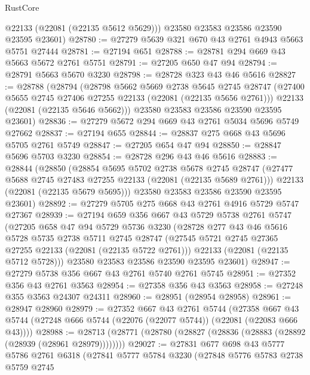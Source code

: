 \begin{lexlean}{RustCore}
\begin{coremodule}
        @22133
        (@22081 (@22135 @5612 @5629)))
      @23580
      @23583
      @23586
      @23590
      @23595
      @23601)
@28780 := @27279 @5639 @321 @670 @43 @2761 @4943 @5663 @5751 @27444
@28781 := @27194 @651
@28788 := @28781 @294 @669 @43 @5663 @5672 @2761 @5751
@28791 := @27205 @650 @47 @94
@28794 := @28791 @5663 @5670 @3230
@28798 := @28728 @323 @43 @46 @5616
@28827 := @28788
    (@28794
      (@28798
        @5662
        @5669
        @2738
        @5645
        @2745
        @28747
        (@27400 @5655 @2745 @27406 @27255 @22133 (@22081 (@22135 @5656 @2761)))
        @22133
        (@22081 (@22135 @5646 @5662)))
      @23580
      @23583
      @23586
      @23590
      @23595
      @23601)
@28836 := @27279 @5672 @294 @669 @43 @2761 @5034 @5696 @5749 @27662
@28837 := @27194 @655
@28844 := @28837 @275 @668 @43 @5696 @5705 @2761 @5749
@28847 := @27205 @654 @47 @94
@28850 := @28847 @5696 @5703 @3230
@28854 := @28728 @296 @43 @46 @5616
@28883 := @28844
    (@28850
      (@28854
        @5695
        @5702
        @2738
        @5678
        @2745
        @28747
        (@27477 @5688 @2745 @27483 @27255 @22133 (@22081 (@22135 @5689 @2761)))
        @22133
        (@22081 (@22135 @5679 @5695)))
      @23580
      @23583
      @23586
      @23590
      @23595
      @23601)
@28892 := @27279 @5705 @275 @668 @43 @2761 @4916 @5729 @5747 @27367
@28939 := @27194
    @659
    @356
    @667
    @43
    @5729
    @5738
    @2761
    @5747
    (@27205
      @658
      @47
      @94
      @5729
      @5736
      @3230
      (@28728
        @277
        @43
        @46
        @5616
        @5728
        @5735
        @2738
        @5711
        @2745
        @28747
        (@27545 @5721 @2745 @27365 @27255 @22133 (@22081 (@22135 @5722 @2761)))
        @22133
        (@22081 (@22135 @5712 @5728)))
      @23580
      @23583
      @23586
      @23590
      @23595
      @23601)
@28947 := @27279 @5738 @356 @667 @43 @2761 @5740 @2761 @5745
@28951 := @27352 @356 @43 @2761 @3563
@28954 := @27358 @356 @43 @3563
@28958 := @27248 @355 @3563 @24307 @24311
@28960 := @28951 (@28954 @28958)
@28961 := @28947 @28960
@28979 := @27352
    @667
    @43
    @2761
    @5744
    (@27358 @667 @43 @5744 (@27248 @666 @5744 (@22076 (@22077 @5744)) (@22081 (@22083 @666 @43))))
@28988 := @28713 (@28771 (@28780 (@28827 (@28836 (@28883 (@28892 (@28939 (@28961 @28979))))))))
@29027 := @27831
    @677
    @698
    @43
    @5777
    @5786
    @2761
    @6318
    (@27841
      @5777
      @5784
      @3230
      (@27848
        @5776
        @5783
        @2738
        @5759
        @2745

\end{coremodule}
\end{lexlean}
